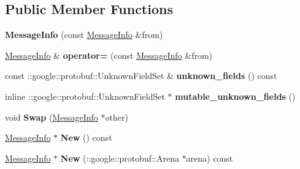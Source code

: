 \subsection*{Public Member Functions}
\begin{DoxyCompactItemize}
\item 
\hypertarget{classstruct_definitions_1_1_message_info_a2fc7a8057ab37d9ada2ad5ea9c1a38dd}{}\label{classstruct_definitions_1_1_message_info_a2fc7a8057ab37d9ada2ad5ea9c1a38dd} 
{\bfseries Message\+Info} (const \hyperlink{classstruct_definitions_1_1_message_info}{Message\+Info} \&from)
\item 
\hypertarget{classstruct_definitions_1_1_message_info_a2e13d61bc6be13ed113913d9043c217c}{}\label{classstruct_definitions_1_1_message_info_a2e13d61bc6be13ed113913d9043c217c} 
\hyperlink{classstruct_definitions_1_1_message_info}{Message\+Info} \& {\bfseries operator=} (const \hyperlink{classstruct_definitions_1_1_message_info}{Message\+Info} \&from)
\item 
\hypertarget{classstruct_definitions_1_1_message_info_a7c0b237239e109169c3b0e9ae6f959fd}{}\label{classstruct_definitions_1_1_message_info_a7c0b237239e109169c3b0e9ae6f959fd} 
const \+::google\+::protobuf\+::\+Unknown\+Field\+Set \& {\bfseries unknown\+\_\+fields} () const
\item 
\hypertarget{classstruct_definitions_1_1_message_info_a45b6b30ed2b756c1755b231446bc4718}{}\label{classstruct_definitions_1_1_message_info_a45b6b30ed2b756c1755b231446bc4718} 
inline \+::google\+::protobuf\+::\+Unknown\+Field\+Set $\ast$ {\bfseries mutable\+\_\+unknown\+\_\+fields} ()
\item 
\hypertarget{classstruct_definitions_1_1_message_info_a44481219d01012304f672a9c6e5cd3d7}{}\label{classstruct_definitions_1_1_message_info_a44481219d01012304f672a9c6e5cd3d7} 
void {\bfseries Swap} (\hyperlink{classstruct_definitions_1_1_message_info}{Message\+Info} $\ast$other)
\item 
\hypertarget{classstruct_definitions_1_1_message_info_aa52552afd24359827be2316af2a509bf}{}\label{classstruct_definitions_1_1_message_info_aa52552afd24359827be2316af2a509bf} 
\hyperlink{classstruct_definitions_1_1_message_info}{Message\+Info} $\ast$ {\bfseries New} () const
\item 
\hypertarget{classstruct_definitions_1_1_message_info_aa746825e77d0f5b633e511f032dfa833}{}\label{classstruct_definitions_1_1_message_info_aa746825e77d0f5b633e511f032dfa833} 
\hyperlink{classstruct_definitions_1_1_message_info}{Message\+Info} $\ast$ {\bfseries New} (\+::google\+::protobuf\+::\+Arena $\ast$arena) const

\end{DoxyCompactItemize}
